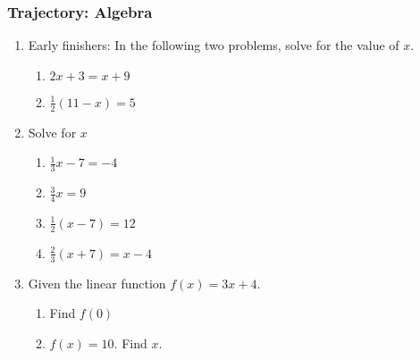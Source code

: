 

\fancyhead[LE]{\thepage}



\subsubsection*{Trajectory: Algebra}
\begin{enumerate}
\item Early finishers: In the following two problems, solve for the value of $x$.
  \begin{multicols}{2}
    \begin{enumerate}
      \item   $2x+3=x + 9$ \vspace{6cm}
      \item   $\frac{1}{2}(11-x)=5$ \vspace{3cm}
    \end{enumerate}
  \end{multicols}
  \vspace{3cm}

\item Solve for $x$
\begin{multicols}{2}
  \begin{enumerate}[itemsep=4cm]
    \item $\frac{1}{3} x-7=-4$
    \item $\frac{3}{4}x =9$
    \item $\frac{1}{2}(x-7)=12$
    \item $\frac{2}{3}(x+7)=x-4$
  \end{enumerate}
\end{multicols} \vspace{4cm}

\item Given the linear function $f(x)=3x+4$.
\begin{multicols}{2}
  \begin{enumerate}
    \item Find $f(0)$ \vspace{6cm}
    \item   $f(x)=10$. Find $x$. \vspace{3cm}
  \end{enumerate}
\end{multicols}
  \vspace{3cm}


\end{enumerate}
